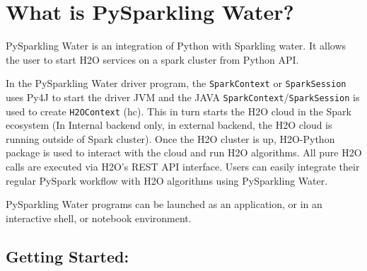 \section{What is PySparkling Water?}

PySparkling Water is an integration of Python with Sparkling water. It allows the user to start H2O services on a spark cluster from Python API.

In the PySparkling Water driver program, the \texttt{SparkContext} or \texttt{SparkSession} uses Py4J to start the driver JVM and the JAVA \texttt{SparkContext}/\texttt{SparkSession} is used to create \texttt{H2OContext} (hc). This in turn starts the H2O cloud in the Spark ecosystem (In Internal backend only, in external backend, the H2O cloud is running outside of Spark cluster).
Once the H2O cluster is up, H2O-Python package is used to interact with the cloud and run H2O algorithms. All pure H2O calls are executed via H2O's REST API interface. Users can easily integrate their regular PySpark workflow with H2O algorithms using PySparkling Water.

PySparkling Water programs can be launched as an application, or in an interactive shell, or notebook environment.

\subsection{Getting Started:}

